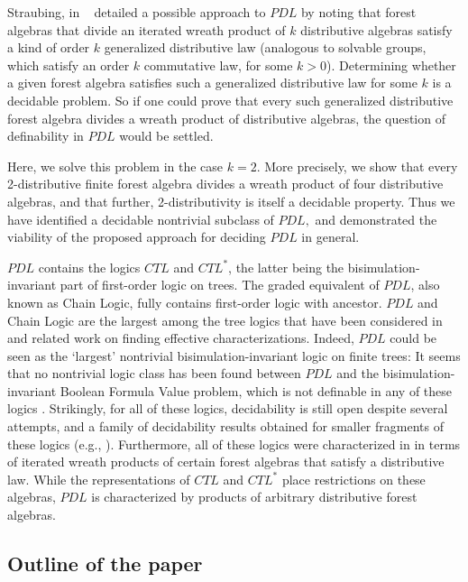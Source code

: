 \documentclass[sigplan,9pt]{acmart}\settopmatter{printfolios=true,printccs=false,printacmref=false}
\theoremstyle{definition}
\begin{document}
Straubing, in ~\cite{straubing-new-2013} detailed a possible approach to $PDL$ by noting that forest algebras that divide an iterated wreath product of $k$ distributive algebras satisfy a kind of order $k$ generalized distributive law (analogous to solvable groups, which satisfy an order $k$ commutative law, for some $k>0$).  Determining whether a given forest algebra satisfies such a generalized distributive law for some $k$ is a decidable problem.  So if one could prove that every such generalized distributive forest algebra divides a wreath product of distributive algebras, the question of definability in $PDL$ would be settled.

Here, we solve this problem in the case $k=2$.  More precisely, we show that every 2-distributive finite forest algebra divides a wreath product of four distributive algebras, and that further, 2-distributivity is itself a decidable property. Thus we have identified a decidable nontrivial subclass of $PDL,$ and demonstrated the viability of the proposed approach for deciding $PDL$ in general.


$PDL$ contains the logics $CTL$ and $CTL^*$, the latter being the bisimulation-invariant part of first-order logic on trees.
The graded equivalent of $PDL$, also known as Chain Logic, fully contains first-order logic with ancestor.
$PDL$ and Chain Logic are the largest among the tree logics that have been considered in \cite{bojanczyk-wreath-2012} and related work on finding effective characterizations.
Indeed, $PDL$ could be seen as the `largest' nontrivial bisimulation-invariant  logic on finite trees: It seems that no nontrivial logic class has been found between $PDL$ and the bisimulation-invariant Boolean Formula Value problem, which is not definable in any of these logics \cite{potthoff-first-order-1995, straubing-new-2013}.
Strikingly, for all of these logics, decidability is still open despite several attempts, and a family of decidability results obtained for smaller fragments of these logics (e.g., \cite{bojanczyk-effective-2008,bojanczyk-piecewise-2012,place-deciding-2010,benedikt-regular-2009}).
Furthermore, all of these logics were characterized in \cite{bojanczyk-wreath-2012} in terms of iterated wreath products of certain forest algebras that satisfy a distributive law.
While the representations of $CTL$ and $CTL^*$ place restrictions on these algebras, $PDL$ is characterized by products of arbitrary distributive forest algebras.


\subsection{Outline of the paper}
\end{document}
